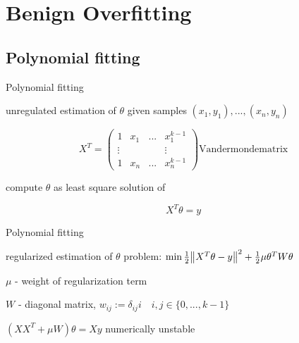 \documentclass{beamer}
\begin{document}
\section{Benign Overfitting}
\subsection{Polynomial fitting}
\begin{frame}{Polynomial fitting}
\begin{block}{unregulated  estimation of \(\theta\)}
given samples \((x_1, y_1), ..., (x_n, y_n)\)

		\begin{equation*}
			X^T = \begin{pmatrix}
			1 & x_1 & ... & x_1^{k-1}\\
			\vdots &&& \vdots\\
			1 & x_n & ... & x_n^{k-1}
			\end{pmatrix} \text{Vandermondematrix}
		\end{equation*}
		
compute \(\theta\) as least square solution of

\begin{equation}
X^T \theta = y
\end{equation}
\end{block}
\end{frame}

\begin{frame}{Polynomial fitting}
\begin{block}{regularized estimation of \(\theta\)}
	problem: \(\min \frac{1}{2} \norm{X^T  \theta -y}^2 + \frac{1}{2} \mu \theta^TW\theta\)
	\vspace{0.5cm}
	\pause
	
	\(\mu\) - weight of regularization term
	
	\(W\) - diagonal matrix, \(w_{ij} := \delta_{ij} i \quad i,j \in \{0,...,k-1\}\)
	\vspace{0.5cm}
	\pause
	
	\(\left(XX^T + \mu W\right) \theta = X y\) \hfill numerically unstable
\end{block}
\end{frame}
\end{document}
